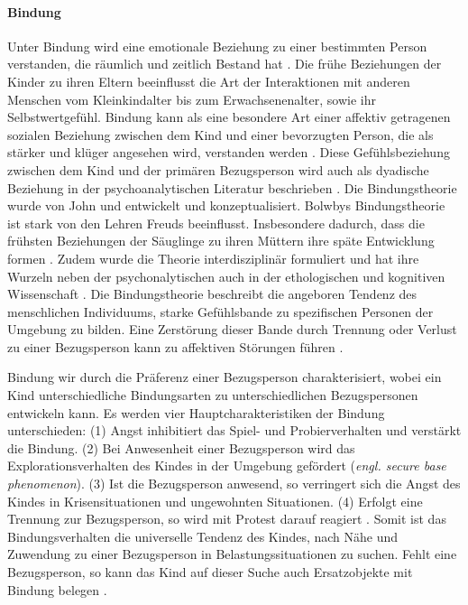 \paragraph{Bindung}\label{par:Bindung}
Unter Bindung wird eine emotionale Beziehung zu einer bestimmten Person verstanden, die räumlich und zeitlich Bestand hat \cite[S.~585ff]{Siegler2008}. Die frühe Beziehungen der Kinder zu ihren Eltern beeinflusst die Art der Interaktionen mit anderen Menschen vom Kleinkindalter bis zum Erwachsenenalter, sowie ihr Selbstwertgefühl. Bindung kann als eine besondere Art einer affektiv getragenen sozialen Beziehung zwischen dem Kind und einer bevorzugten Person, die als stärker und klüger angesehen wird, verstanden werden \cite{Biringen1994}. Diese Gefühlsbeziehung zwischen dem Kind und der primären Bezugsperson wird auch als dyadische Beziehung in der psychoanalytischen Literatur beschrieben \cite{Resch1999}. Die Bindungstheorie wurde von John  und  entwickelt und konzeptualisiert. Bolwbys Bindungstheorie ist stark von den Lehren Freuds beeinflusst. Insbesondere dadurch, dass die frühsten Beziehungen der Säuglinge zu ihren Müttern ihre späte Entwicklung formen \cite{Siegler2008}. Zudem wurde die Theorie interdisziplinär formuliert und hat ihre Wurzeln neben der psychonalytischen auch in der ethologischen und kognitiven Wissenschaft \cite{Resch1999}. Die Bindungstheorie beschreibt die angeboren Tendenz des menschlichen Individuums, starke Gefühlsbande zu spezifischen Personen der Umgebung zu bilden. Eine Zerstörung dieser Bande durch Trennung oder Verlust zu einer Bezugsperson kann zu affektiven Störungen führen \cite{Resch1999}. 

Bindung wir durch die Präferenz einer Bezugsperson charakterisiert, wobei ein Kind unterschiedliche Bindungsarten zu unterschiedlichen Bezugspersonen entwickeln kann. Es werden vier Hauptcharakteristiken der Bindung unterschieden: (1) Angst inhibitiert das Spiel- und Probierverhalten und verstärkt die Bindung. (2) Bei Anwesenheit einer Bezugsperson wird das Explorationsverhalten des Kindes in der Umgebung gefördert (\textit{engl. secure base phenomenon}). (3) Ist die Bezugsperson anwesend, so verringert sich die Angst des Kindes in Krisensituationen und ungewohnten Situationen. (4) Erfolgt eine Trennung zur Bezugsperson, so wird mit Protest darauf reagiert \cite{Resch1999}. Somit ist das Bindungsverhalten die universelle Tendenz des Kindes, nach Nähe und Zuwendung zu einer Bezugsperson in Belastungssituationen zu suchen. Fehlt eine Bezugsperson, so kann das Kind auf dieser Suche auch Ersatzobjekte mit Bindung belegen \cite{Resch1999}.

